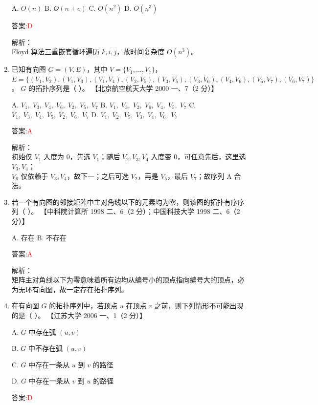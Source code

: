 \documentclass[lang=cn,newtx,10pt,scheme=chinese]{../../../elegantbook}
\begin{document}
\begin{enumerate}
    A. $O(n)$  
    B. $O(n+e)$  
    C. $O(n^2)$  
    D. $O(n^3)$

    答案:\textcolor{red}{D}

    解析：\\
    Floyd 算法三重嵌套循环遍历 $k,i,j$，故时间复杂度 $O(n^3)$。\\

\item 已知有向图 $G=(V,E)$，其中  
$V=\{V_1,\dots,V_7\}$，  
$E=\{(V_1,V_2),(V_1,V_3),(V_1,V_4),(V_2,V_5),(V_3,V_5),(V_3,V_6),(V_4,V_6),(V_5,V_7),(V_6,V_7)\}$。  
$G$ 的拓扑序列是（ ）。  
    【北京航空航天大学 2000 一、7（2 分）】

    A. $V_1,\;V_3,\;V_4,\;V_6,\;V_2,\;V_5,\;V_7$  
    B. $V_1,\;V_3,\;V_2,\;V_6,\;V_4,\;V_5,\;V_7$  
    C. $V_1,\;V_3,\;V_4,\;V_5,\;V_2,\;V_6,\;V_7$  
    D. $V_1,\;V_2,\;V_5,\;V_3,\;V_4,\;V_6,\;V_7$

    答案:\textcolor{red}{A}

    解析：\\
    初始仅 $V_1$ 入度为 0，先选 $V_1$；随后 $V_2,V_3,V_4$ 入度变 0，可任意先后，这里选 $V_3,V_4$；\\
    $V_6$ 仅依赖于 $V_3,V_4$，故下一；之后可选 $V_2$，再是 $V_5$，最后 $V_7$；故序列 A 合法。\\

\item 若一个有向图的邻接矩阵中主对角线以下的元素均为零，则该图的拓扑有序序列（ ）。  
    【中科院计算所 1998 二、6（2 分）；中国科技大学 1998 二、6（2 分）】

    A. 存在  
    B. 不存在

    答案:\textcolor{red}{A}

    解析：\\
    矩阵主对角线以下为零意味着所有边均从编号小的顶点指向编号大的顶点，必为无环有向图，故一定存在拓扑序列。\\


    \item 在有向图 $G$ 的拓扑序列中，若顶点 $u$ 在顶点 $v$ 之前，则下列情形不可能出现的是（ ）。  
    【江苏大学 2006 一、1（2 分）】  

    A. $G$ 中存在弧 $(u, v)$  

    B. $G$ 中不存在弧 $(u, v)$  

    C. $G$ 中存在一条从 $u$ 到 $v$ 的路径  

    D. $G$ 中存在一条从 $v$ 到 $u$ 的路径  

    答案:\textcolor{red}{D}


\end{enumerate}
\end{document}
